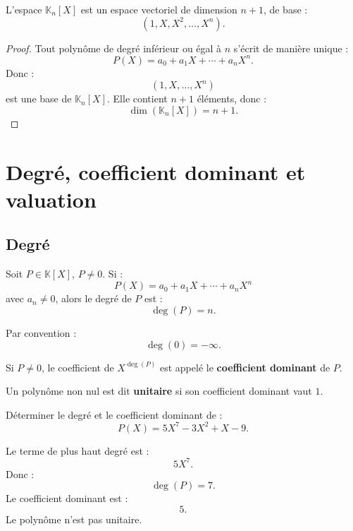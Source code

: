 \documentclass[11pt,a4paper]{article}
\newcommand{\K}{\mathbb K}
\begin{document}
\begin{theorembox}
L'espace \(\K_n[X]\) est un espace vectoriel de dimension \(n+1\), de base :
\[
(1,X,X^2,\dots,X^n).
\]
\end{theorembox}

\begin{proof}
Tout polynôme de degré inférieur ou égal à \(n\) s'écrit de manière unique :
\[
P(X)=a_0+a_1X+\cdots+a_nX^n.
\]
Donc :
\[
(1,X,\dots,X^n)
\]
est une base de \(\K_n[X]\).  
Elle contient \(n+1\) éléments, donc :
\[
\dim(\K_n[X])=n+1.
\]
\end{proof}

\section{Degré, coefficient dominant et valuation}

\subsection{Degré}

\begin{definitionbox}[Degré]
Soit \(P\in\K[X]\), \(P\neq0\).  
Si :
\[
P(X)=a_0+a_1X+\cdots+a_nX^n
\]
avec \(a_n\neq0\), alors le degré de \(P\) est :
\[
\deg(P)=n.
\]
\end{definitionbox}

\begin{definitionbox}[Convention]
Par convention :
\[
\deg(0)=-\infty.
\]
\end{definitionbox}

\begin{definitionbox}
Si \(P\neq0\), le coefficient de \(X^{\deg(P)}\) est appelé le \textbf{coefficient dominant} de \(P\).
\end{definitionbox}

\begin{definitionbox}
Un polynôme non nul est dit \textbf{unitaire} si son coefficient dominant vaut \(1\).
\end{definitionbox}

\begin{exercicebox}
Déterminer le degré et le coefficient dominant de :
\[
P(X)=5X^7-3X^2+X-9.
\]
\end{exercicebox}

\begin{correctionbox}
Le terme de plus haut degré est :
\[
5X^7.
\]
Donc :
\[
\deg(P)=7.
\]
Le coefficient dominant est :
\[
5.
\]
Le polynôme n'est pas unitaire.
\end{correctionbox}
\end{document}
